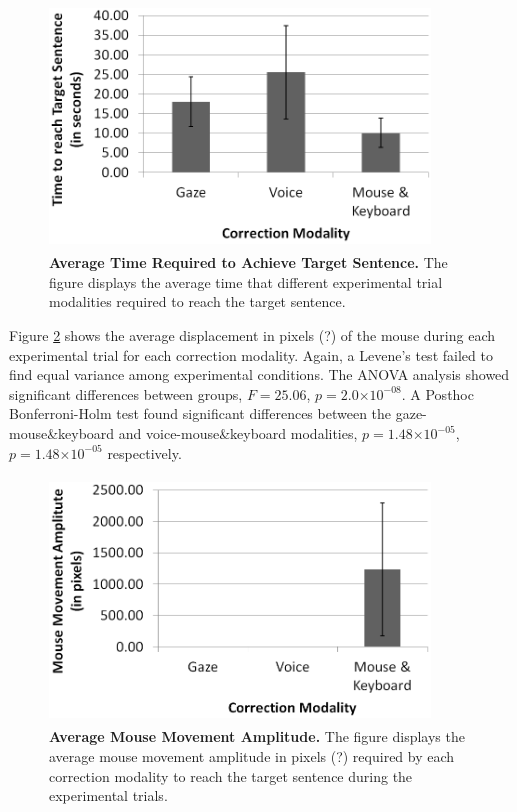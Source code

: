\documentclass[]{article}
\providecommand{\e}[1]{\ensuremath{\times 10^{#1}}}
\begin{document}
\begin{figure}[ht]
\begin{center}
\includegraphics[width=0.9\textwidth,height=65mm]{figures/time.png}
\end{center}
\vspace{-3mm}
\caption{\textbf{Average Time Required to Achieve Target Sentence.} The figure displays the average time that different
experimental trial modalities required to reach the target sentence.}
\label{timeFig}
\end{figure}

Figure \ref{mouseDisplacement} shows the average displacement in pixels (?) of the mouse during each experimental trial
for each correction modality. Again, a Levene's test failed to find equal variance among experimental conditions. The ANOVA
analysis showed significant differences between groups,  $F=25.06$, $p=2.0\e{-08}$. A Posthoc Bonferroni-Holm test
found significant differences between the gaze-mouse\&keyboard and voice-mouse\&keyboard modalities,  $p=1.48\e{-05}$,
$p=1.48\e{-05}$ respectively.


\begin{figure}[ht]
\begin{center}
\vspace{-3mm}
\includegraphics[width=0.9\textwidth,height=65mm]{figures/mouseDisplacement.png}
\end{center}
\caption{\textbf{Average Mouse Movement Amplitude.} The figure displays the average mouse movement amplitude in pixels
(?) required by each correction modality to reach the target sentence during the experimental trials.}
\label{mouseDisplacement}
\end{figure}
\end{document}
